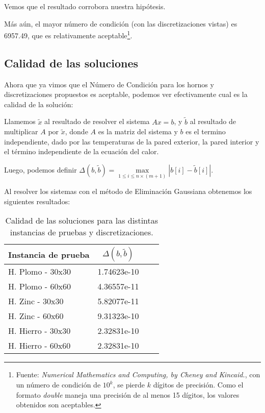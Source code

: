 Vemos que el resultado corrobora nuestra hipótesis.

Más aún, el mayor número de condición (con las discretizaciones vistas) es 6957.49, que es relativamente aceptable\footnote{Fuente: \textit{Numerical Mathematics and Computing, by Cheney and Kincaid.}, con un número de condición de $10^k$, se pierde $k$ dígitos de precisión. Como el formato \textit{double} maneja una precisión de al menos 15 dígitos, los valores obtenidos son aceptables.}.

\subsection{Calidad de las soluciones}

Ahora que ya vimos que el Número de Condición para los hornos y discretizaciones propuestos es aceptable, podemos ver efectivamente cual es la calidad de la solución:

Llamemos $\tilde{x}$ al resultado de resolver el sistema $Ax = b$, y $\tilde{b}$ al resultado de multiplicar $A$ por $\tilde{x}$, donde $A$ es la matriz del sistema y $b$ es el termino independiente, dado por las temperaturas de la pared exterior, la pared interior y el término independiente de la ecuación del calor.

\medskip

Luego, podemos definir $\Delta(b, \tilde{b}) = \max\limits_{1 \leq i \leq n\times(m+1)}|b[i] - \tilde{b}[i]|$.

Al resolver los sistemas con el método de Eliminación Gaussiana obtenemos los siguientes resultados:

\begin{table}[H]
    \begin{center}
        \begin{tabular}{| l | c | c | c |}
            \hline
            Instancia de prueba & $\Delta(b, \tilde{b})$ \\ \hline
            H. Plomo - 30x30    & 1.74623e-10            \\
            H. Plomo - 60x60    & 4.36557e-11            \\
            H. Zinc - 30x30     & 5.82077e-11            \\
            H. Zinc - 60x60     & 9.31323e-10            \\
            H. Hierro - 30x30   & 2.32831e-10            \\
            H. Hierro - 60x60   & 2.32831e-10            \\
            \hline
        \end{tabular}
        \captionsetup{justification=centering}
        \caption{Calidad de las soluciones para las distintas instancias de pruebas y discretizaciones.}
    \end{center}
\end{table}

